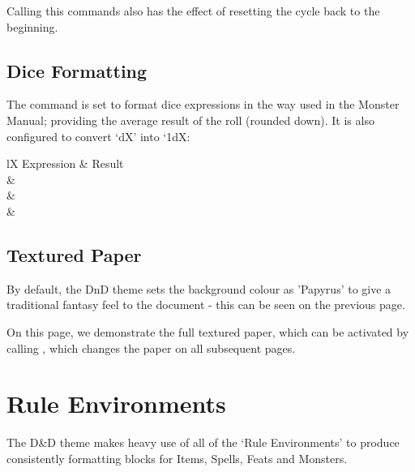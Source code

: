 \documentclass[theme=dnd,size=10pt,columns=2,justified]{rpgbook}
\begin{document}
					Calling this commands also has the effect of resetting the cycle back to the beginning.

					\RpgSetPHBColors{}
			\subsection{Dice Formatting}
				The  command is set to format dice expressions in the way used in the Monster Manual; providing the average result of the roll (rounded down). It is also configured to convert `dX' into `1dX:
				\begin{RpgTable}{lX}
					Expression & Result
					\\
					 & 
					\\
					 & 
					\\
					 & 
				\end{RpgTable}


			\subsection{Textured Paper}
				By default, the DnD theme sets the background colour as 'Papyrus' to give a traditional fantasy feel to the document - this can be seen on the previous page.

				On this page, we demonstrate the full textured paper, which can be activated by calling , which changes the paper on all subsequent pages.
				\RpgSetDndPaper{}



		\section{Rule Environments}

			The D\&D theme makes heavy use of all of the `Rule Environments' to produce consistently formatting blocks for Items, Spells, Feats and Monsters.
\end{document}
